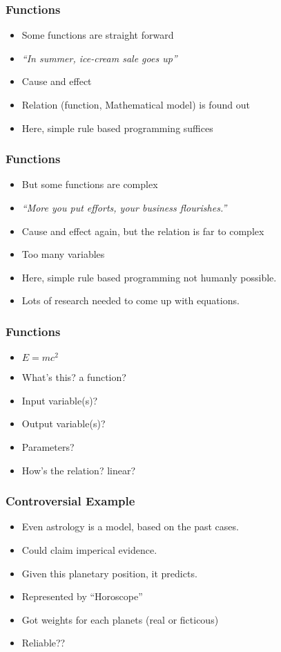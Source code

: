 \begin{frame}[fragile]\frametitle{Functions}
\begin{itemize}
\item Some functions are straight forward
\item {\em ``In summer, ice-cream sale goes up''}
\item Cause and effect
\item Relation (function, Mathematical model) is found out
\item Here, simple rule based programming suffices
\end{itemize}
\end{frame}

\begin{frame}[fragile]\frametitle{Functions}
\begin{itemize}
\item But some functions are complex
\item {\em ``More you put efforts, your business flourishes.''}
\item Cause and effect again, but the relation is far to complex
\item Too many variables
\item Here, simple rule based programming not humanly possible.
\item Lots of research needed to come up with equations.
\end{itemize}
\end{frame}

\begin{frame}[fragile]\frametitle{Functions}
\begin{itemize}
\item $E = mc^2$
\item What's this? a function?
\item Input variable(s)?
\item Output variable(s)?
\item Parameters?
\item How's the relation? linear?
\end{itemize}
\end{frame}

\begin{frame}[fragile]\frametitle{Controversial Example}
\begin{itemize}
\item Even astrology is a model, based on the past cases.
\item Could claim imperical evidence. 
\item Given this planetary position, it predicts.
\item Represented by ``Horoscope''
\item Got weights for each planets (real or ficticous)
\item Reliable??
\end{itemize}
\end{frame}


